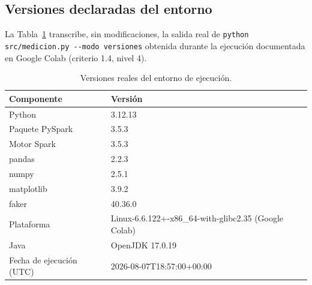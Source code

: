 \documentclass[11pt,a4paper]{article}
\begin{document}
\begin{table}[htbp]
\centering
\caption{Verificaci\'on de equivalencia num\'erica pandas $\leftrightarrow$ PySpark.}
\label{tab:equivalencia}
\end{table}

\subsection{Versiones declaradas del entorno}
\label{sec:versiones}

La Tabla~\ref{tab:versiones} transcribe, sin modificaciones, la salida real
de \texttt{python src/medicion.py -{}-modo versiones} obtenida durante la
ejecuci\'on documentada en Google Colab (criterio 1.4, nivel 4).

\begin{table}[htbp]
\centering
\caption{Versiones reales del entorno de ejecuci\'on.}
\label{tab:versiones}
\begin{tabular}{@{}ll@{}}
\toprule
\textbf{Componente} & \textbf{Versi\'on} \\
\midrule
Python & 3.12.13 \\
Paquete PySpark & 3.5.3 \\
Motor Spark & 3.5.3 \\
pandas & 2.2.3 \\
numpy & 2.5.1 \\
matplotlib & 3.9.2 \\
faker & 40.36.0 \\
Plataforma & Linux-6.6.122+-x86\_64-with-glibc2.35 (Google Colab) \\
Java & OpenJDK 17.0.19 \\
Fecha de ejecuci\'on (UTC) & 2026-08-07T18:57:00+00:00 \\
\bottomrule
\end{tabular}
\end{table}
\end{document}
